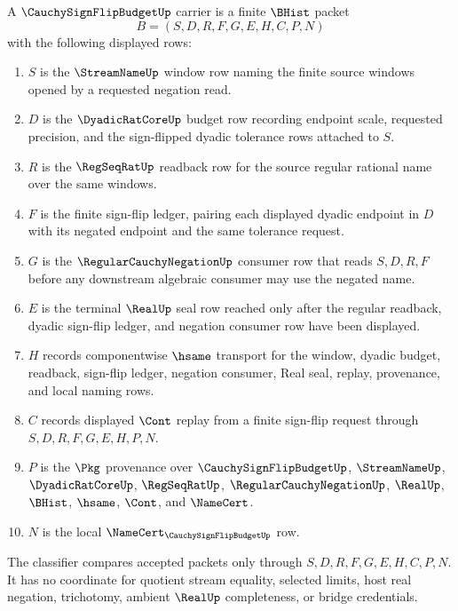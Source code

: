 \begin{definition}
\label{def:cauchy-sign-flip-budget-carrier}
A $\CauchySignFlipBudgetUp$ carrier is a finite $\BHist$ packet
$$
B=(S,D,R,F,G,E,H,C,P,N)
$$
with the following displayed rows:
\begin{enumerate}
\item $S$ is the $\StreamNameUp$ window row naming the finite source windows opened by a requested negation read.
\item $D$ is the $\DyadicRatCoreUp$ budget row recording endpoint scale, requested precision, and the sign-flipped dyadic tolerance rows attached to $S$.
\item $R$ is the $\RegSeqRatUp$ readback row for the source regular rational name over the same windows.
\item $F$ is the finite sign-flip ledger, pairing each displayed dyadic endpoint in $D$ with its negated endpoint and the same tolerance request.
\item $G$ is the $\RegularCauchyNegationUp$ consumer row that reads $S,D,R,F$ before any downstream algebraic consumer may use the negated name.
\item $E$ is the terminal $\RealUp$ seal row reached only after the regular readback, dyadic sign-flip ledger, and negation consumer row have been displayed.
\item $H$ records componentwise $\hsame$ transport for the window, dyadic budget, readback, sign-flip ledger, negation consumer, Real seal, replay, provenance, and local naming rows.
\item $C$ records displayed $\Cont$ replay from a finite sign-flip request through $S,D,R,F,G,E,H,P,N$.
\item $P$ is the $\Pkg$ provenance over $\CauchySignFlipBudgetUp$, $\StreamNameUp$, $\DyadicRatCoreUp$, $\RegSeqRatUp$, $\RegularCauchyNegationUp$, $\RealUp$, $\BHist$, $\hsame$, $\Cont$, and $\NameCert$.
\item $N$ is the local $\NameCert_{\CauchySignFlipBudgetUp}$ row.
\end{enumerate}
The classifier compares accepted packets only through $S,D,R,F,G,E,H,C,P,N$. It has no coordinate for quotient stream equality, selected limits, host real negation, trichotomy, ambient $\RealUp$ completeness, or bridge credentials.
\end{definition}

